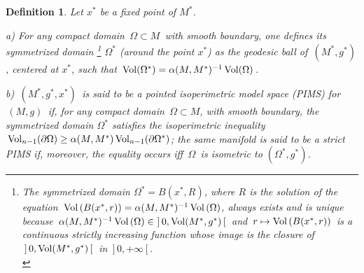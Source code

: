 \documentclass[11pt, reqno]{amsart}
\newtheorem{definition}[theoreme]{Definition}
\theoremstyle{plain}
\begin{document}
\begin{definition}\label{espacemodele}
Let $x^*$ be a fixed point of $M^*$.

\noindent
a) For any compact domain $\,\Omega \subset M\,$ with smooth boundary, one defines
its {\em symmetrized domain}
\footnote{The symmetrized domain $\Omega^* = B(x^* , R)$, where $R$ is
the solution of the equation $\, {\rm Vol} \left(B(x^* , r ) \right) = \alpha (M,M^*)^{-1}\,  
{\rm Vol} \left( \Omega \right)$, always exists and is unique because  
$\,\alpha (M,M^*)^{-1}\,  {\rm Vol} \left( \Omega \right)  \in\  ]\,0, {\rm Vol} (M^*,g^*)\,[ \,$
and $\, r \mapsto {\rm Vol} \left(B(x^* , r ) \right) \,$ is a continuous
strictly increasing function whose image is the closure of $\,]\,0, {\rm Vol} (M^*,g^*)\,[\,$ in $\,]\,0, +\infty \,[\,$.\\}
$\Omega^*$ (around the point $x^*$) 
as the geodesic ball  of $\,(M^*,g^*)\,$,
centered at $x^*$, such that $\, {\rm Vol} (\Omega^*) = \alpha (M,M^*)^{-1}\, 
{\rm Vol} (\Omega)\,$.

\noindent
b) $\,(M^*,g^*, x^*)\,$ is said to be a {\em pointed isoperimetric  model space}  ({\em PIMS) 
for $\,(M,g)\,$} if, 
for any compact domain $\,\Omega \subset M$, with smooth boundary, the symmetrized domain $\Omega^*$ satisfies the {\em isoperimetric inequality} 
$\, {\rm Vol}_{n-1}(\partial \Omega) \ge  \alpha (M,M^*)\, {\rm Vol}_{n-1}(\partial \Omega^*)$;
the same manifold is said to be a {\em strict PIMS}  if, moreover, the equality occurs iff $\,\Omega\,$ is {\em isometric} to $(\Omega^*, g^*)$.
\end{definition}
\end{document}
